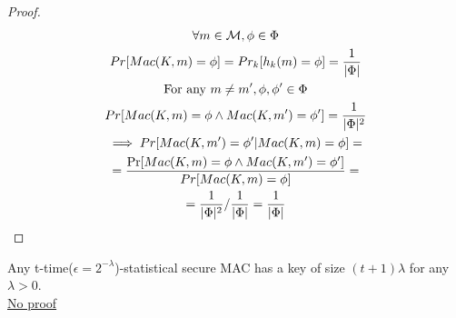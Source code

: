 \begin{proof}
    \begin{gather*}
        \forall m \in \mathcal{M}, \phi \in \Phi\\
        Pr[Mac(K,m)=\phi]=Pr_k[h_k(m)=\phi]=\frac{1}{|\Phi|}\\
        \text{For any } m\neq m', \phi,\phi' \in \Phi\\
        Pr[Mac(K,m)=\phi \wedge Mac(K,m')=\phi']=\frac{1}{|\Phi|^2}\\
        \implies Pr[Mac(K,m')=\phi'| Mac(K,m)=\phi]=\\
        =\frac{\Pr[Mac(K,m)=\phi \wedge Mac(K,m')=\phi']}{Pr[Mac(K,m)=\phi]}=\\
        =\frac{1}{|\Phi|^2}/\frac{1}{|\Phi|}=\frac{1}{|\Phi|}
    \end{gather*}
\end{proof}
\begin{theorem}
    Any t-time($\epsilon=2^{-\lambda}$)-statistical secure MAC has a key of size $(t+1) \lambda$ for any $\lambda > 0$.\\
    \underline{No proof}
\end{theorem}